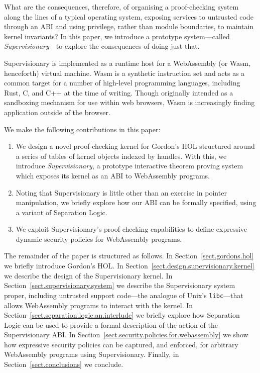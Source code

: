 \documentclass[a4paper, 10pt]{article}
\begin{document}
What are the consequences, therefore, of organising a proof-checking system along the lines of a typical operating system, exposing services to untrusted code through an ABI and using privilege, rather than module boundaries, to maintain kernel invariants?
In this paper, we introduce a prototype system---called \emph{Supervisionary}---to explore the consequences of doing just that.

Supervisionary is implemented as a runtime host for a WebAssembly (or Wasm, henceforth) virtual machine.
Wasm is a synthetic instruction set and acts as a common target for a number of high-level programming languages, including Rust, C, and C++ at the time of writing.
Though originally intended as a sandboxing mechanism for use within web browsers, Wasm is increasingly finding application outside of the browser.

\noindent
We make the following contributions in this paper:

\begin{enumerate}
\item
We design a novel proof-checking kernel for Gordon's HOL structured around a series of tables of kernel objects indexed by handles.
With this, we introduce \emph{Supervisionary}, a prototype interactive theorem proving system which exposes its kernel as an ABI to WebAssembly programs.
\item
Noting that Supervisionary is little other than an exercise in pointer manipulation, we briefly explore how our ABI can be formally specified, using a variant of Separation Logic.
\item
We exploit Supervisionary's proof checking capabilities to define expressive dynamic security policies for WebAssembly programs.
\end{enumerate}

The remainder of the paper is structured as follows.
In Section~\ref{sect.gordons.hol} we briefly introduce Gordon's HOL.
In Section~\ref{sect.design.supervisionary.kernel} we describe the design of the Supervisionary kernel.
In Section~\ref{sect.supervisionary.system} we describe the Supervisionary system proper, including untrusted support code---the analogue of Unix's \texttt{libc}---that allows WebAssembly programs to interact with the kernel.
In Section~\ref{sect.separation.logic.an.interlude} we briefly explore how Separation Logic can be used to provide a formal description of the action of the Supervisionary ABI.
In Section~\ref{sect.security.policies.for.webassembly} we show how expressive security policies can be captured, and enforced, for arbitrary WebAssembly programs using Supervisionary.
Finally, in Section~\ref{sect.conclusions} we conclude.
\end{document}
